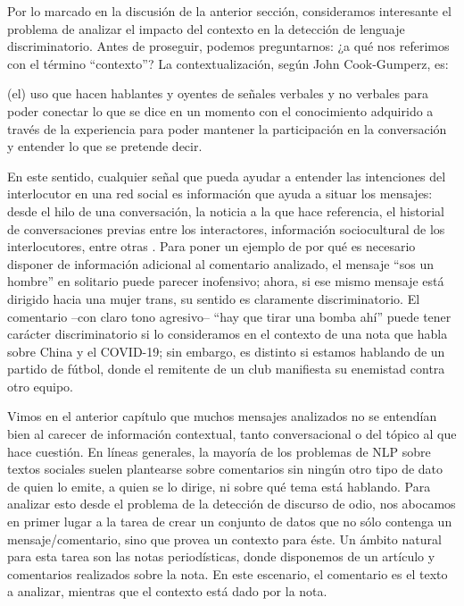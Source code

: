 \label{chap:05_dataset_creation}

Por lo marcado en la discusión de la anterior sección, consideramos interesante el problema de analizar el impacto del contexto en la detección de lenguaje discriminatorio. Antes de proseguir, podemos preguntarnos: ¿a qué nos referimos con el término ``contexto''? La contextualización, según John Cook-Gumperz, es:

\begin{displayquote}
    (el) uso que hacen hablantes y oyentes de señales verbales y no verbales para poder conectar lo que se dice en un momento con el conocimiento adquirido a través de la experiencia para poder mantener la participación en la conversación y entender lo que se pretende decir.
\end{displayquote}

En este sentido, cualquier señal que pueda ayudar a entender las intenciones del interlocutor en una red social es información que ayuda a situar los mensajes: desde el hilo de una conversación, la noticia a la que hace referencia, el historial de conversaciones previas entre los interactores, información sociocultural de los interlocutores, entre otras \cite{sheth2021defining}. Para poner un ejemplo de por qué es necesario disponer de información adicional al comentario analizado, el mensaje ``sos un hombre'' en solitario puede parecer inofensivo; ahora, si ese mismo mensaje está dirigido hacia una mujer trans, su sentido es claramente discriminatorio. El comentario --con claro tono agresivo-- ``hay que tirar una bomba ahí'' puede tener carácter discriminatorio si lo consideramos en el contexto de una nota que habla sobre China y el COVID-19; sin embargo, es distinto si estamos hablando de un partido de fútbol, donde el remitente de un club manifiesta su enemistad contra otro equipo.


Vimos en el anterior capítulo que muchos mensajes analizados no se entendían bien al carecer de información contextual, tanto conversacional o del tópico al que hace cuestión. En líneas generales, la mayoría de los problemas de NLP sobre textos sociales suelen plantearse sobre comentarios sin ningún otro tipo de dato de quien lo emite, a quien se lo dirige, ni sobre qué tema está hablando. Para analizar esto desde el problema de la detección de discurso de odio, nos abocamos en primer lugar a la tarea de crear un conjunto de datos que no sólo contenga un mensaje/comentario, sino que provea un contexto para éste. Un ámbito natural para esta tarea son las notas periodísticas, donde disponemos de un artículo y comentarios realizados sobre la nota. En este escenario, el comentario es el texto a analizar, mientras que el contexto está dado por la nota.

